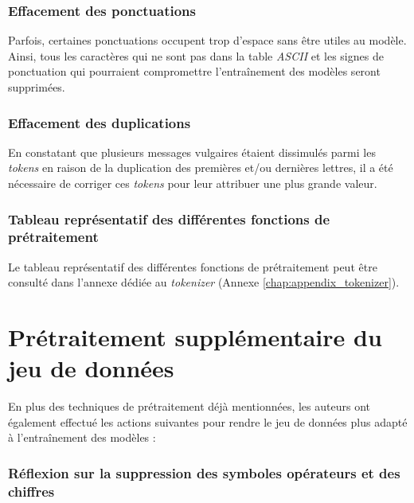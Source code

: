 \subsubsection*{Effacement des ponctuations}

Parfois, certaines ponctuations occupent trop d'espace sans être utiles au modèle. Ainsi, tous les caractères qui ne sont pas dans la table \textit{ASCII} et les signes de ponctuation qui pourraient compromettre l'entraînement des modèles seront supprimées.

\subsubsection*{Effacement des duplications}
En constatant que plusieurs messages vulgaires étaient dissimulés parmi les \textit{tokens} en raison de la duplication des premières et/ou dernières lettres, il a été nécessaire de corriger ces \textit{tokens} pour leur attribuer une plus grande valeur.

\subsubsection*{Tableau représentatif des différentes fonctions de prétraitement}
Le tableau représentatif des différentes fonctions de prétraitement peut être consulté dans l'annexe dédiée au \textit{tokenizer} (Annexe \ref{chap:appendix_tokenizer}).

\section{Prétraitement supplémentaire du jeu de données}

En plus des techniques de prétraitement déjà mentionnées, les auteurs ont également effectué les actions suivantes pour rendre le jeu de données plus adapté à l'entraînement des modèles :

\subsubsection*{Réflexion sur la suppression des symboles opérateurs et des chiffres}

